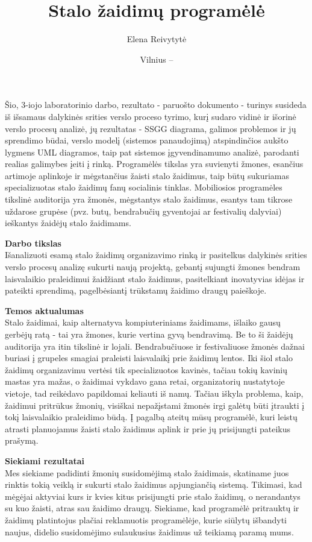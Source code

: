 \documentclass{VUMIFPSkursinis}
\title{Stalo žaidimų programėlė}
\author{Elena Reivytytė}
\date{Vilnius – \the\year}
\begin{document}
\maketitle

Šio, 3-iojo laboratorinio darbo, rezultato - paruošto dokumento  - turinys susideda iš išsamaus dalykinės srities verslo proceso tyrimo, kurį sudaro vidinė ir išorinė verslo procesų analizė, jų rezultatas - SSGG diagrama,  galimos problemos ir jų sprendimo būdai, verslo modelį (sistemos panaudojimą) atspindinčios aukšto lygmens UML diagramos, taip pat sistemos įgyvendinamumo analizė, parodanti realias galimybes įeiti į rinką. Programėlės tikslas yra suvienyti žmones, esančius artimoje aplinkoje ir mėgstančius žaisti stalo žaidimus, taip būtų sukuriamas specializuotas stalo žaidimų fanų socialinis tinklas. Mobiliosios programėles tikslinė auditorija yra žmonės, mėgstantys stalo žaidimus, esantys tam tikrose uždarose grupėse (pvz. butų, bendrabučių gyventojai ar festivalių dalyviai) ieškantys žaidėjų stalo žaidimams. 

\tableofcontents

\textbf{Darbo tikslas}\\
Išanalizuoti esamą stalo žaidimų organizavimo rinką ir pasitelkus dalykinės srities verslo procesų analizę sukurti naują projektą, 
gebantį sujungti žmones bendram laisvalaikio praleidimui žaidžiant stalo žaidimus, pasitelkiant 
inovatyvias idėjas ir pateikti sprendimą, pagelbėsiantį trūkstamų žaidimo draugų paieškoje.

\textbf{Temos aktualumas}\\
Stalo žaidimai, kaip alternatyva kompiuteriniams žaidimams, išlaiko gausų gerbėjų ratą - tai 
yra žmones, kurie vertina gyvą bendravimą. Be to ši žaidėjų auditorija yra itin tikslinė ir 
lojali. Bendrabučiuose ir festivaliuose žmonės dažnai buriasi į grupeles smagiai praleisti 
laisvalaikį prie žaidimų lentos. Iki šiol stalo žaidimų organizavimu vertėsi tik specializuotos 
kavinės, tačiau tokių kavinių mastas yra mažas, o žaidimai vykdavo gana retai, organizatorių 
nustatytoje vietoje, tad reikėdavo papildomai keliauti iš namų. Tačiau iškyla problema, kaip, 
žaidimui pritrūkus žmonių, visiškai nepažįstami žmonės irgi galėtų būti įtraukti į tokį laisvalaikio 
praleidimo būdą. Į pagalbą ateitų mūsų programėlė, kuri leistų atrasti planuojamus žaisti stalo 
žaidimus aplink ir prie jų prisijungti pateikus prašymą.

\textbf{Siekiami rezultatai}\\
Mes siekiame padidinti žmonių susidomėjimą stalo žaidimais, skatiname juos rinktis tokią veiklą 
ir sukurti stalo žaidimus apjungiančią sistemą. Tikimasi, kad mėgėjai aktyviai kurs ir kvies 
kitus prisijungti prie stalo žaidimų, o nerandantys su kuo žaisti, atras sau žaidimo draugų. 
Siekiame, kad programėlė pritrauktų ir žaidimų platintojus plačiai reklamuotis programėlėje, 
kurie siūlytų išbandyti naujus, didelio susidomėjimo sulaukusius žaidimus už teikiamą paramą mums.
\end{document}
